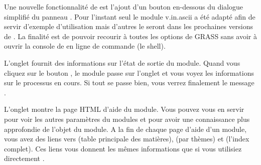 {%
Une nouvelle fonctionnalité de \qg \CURRENT est l'ajout d'un bouton  en-dessous du dialogue simplifié du panneau . Pour l'instant seul le module v.in.ascii a été adapté afin de servir d'exemple d'utilisation mais d'autres le seront dans les prochaines versions de \qg. La finalité est de pouvoir recourir à toutes les options de GRASS sans avoir à ouvrir la console de en ligne de commande (le shell).


L'onglet  fournit des informations sur l'état de sortie du module. Quand vous cliquez sur le bouton , le module passe sur l'onglet  et vous voyez les informations sur le processus en cours. Si tout se passe bien, vous verrez finalement le message .


L'onglet  montre la page HTML d'aide du module. Vous pouvez vous en servir pour voir les autres paramètres du modules et pour avoir une
connaissance plus approfondie de l'objet du module. A la fin de chaque page d'aide d'un module, vous avez des liens vers  (table principale des matières), (par thèmes) et (l'index complet). Ces liens vous donnent les mêmes informations que si vous utilisiez directement .

}
